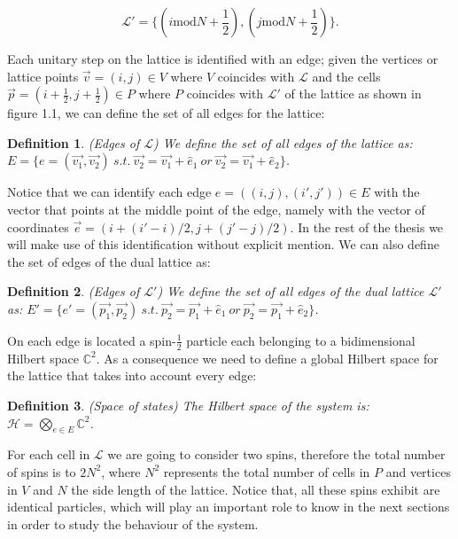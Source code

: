 \documentclass{Configuration_Files/PoliMi3i_thesis}
\newtheorem{definition}{Definition}[chapter]
\begin{document}
\[
  \mathcal{L}' = \{ (i\mathrm{mod}N +\frac{1}{2}), (j\mathrm{mod}N +\frac{1}{2})\}.
\]

Each unitary step on the lattice is identified with an edge; given the vertices or lattice points $\vec{v}=(i,j) \in V$ where $V$ coincides with $\mathcal{L}$ and the cells $\vec{p}=(i+\frac{1}{2},j+\frac{1}{2})\in P$ where $P$ coincides with $ \mathcal{L'}$ of the lattice as shown in figure 1.1, we can define the set of all edges for the lattice:

\begin{definition}(Edges of $\mathcal{L}$)
	We define the set of all edges of the lattice as: $E = \{e=(\vec{v_1},\vec{v_2}) \ s.t. \ \vec{v_2}=\vec{v_1}+\hat{e}_1 \ or \ \vec{v_2}=\vec{v_1}+\hat{e}_2 \}$.
\end{definition}

Notice that we can identify each edge $e=((i,j),(i',j')) \in E$ with the vector that points at the middle point of the edge, namely with the vector of coordinates $\vec{e}=(i + (i'-i)/2, j + (j'-j)/2)$. In the rest of the thesis we will make use of this identification without explicit mention. We can also define the set of edges of the dual lattice as:

\begin{definition}(Edges of $\mathcal{L'}$)
	We define the set of all edges of the dual lattice $\mathcal{L'}$ as: $E' = \{e'=(\vec{p_1},\vec{p_2}) \ s.t. \ \vec{p_2}=\vec{p_1}+\hat{e}_1 \ or \ \vec{p_2}=\vec{p_1}+\hat{e}_2 \}$.
\end{definition}

On each edge is located a spin-$\frac{1}{2}$ particle each belonging to a bidimensional Hilbert space $\mathbb{C}^2$. As a consequence we need to define a global Hilbert space for the lattice that takes into account every edge:

\begin{definition}(Space of states)
	The Hilbert space of the system is: $\mathscr{H}= \bigotimes_{e \in E} \mathbb{C}^2$.
\end{definition}

For each cell in $\mathcal{L}$ we are going to consider two spins, therefore the total number of spins is to $2N^2$, where $N^2$ represents the total number of cells in $P$ and vertices in $V$ and $N$ the side length of the lattice. \newline
Notice that, all these spins exhibit are identical particles, which will play an important role to know in the next sections in order to study the behaviour of the system.
\end{document}
